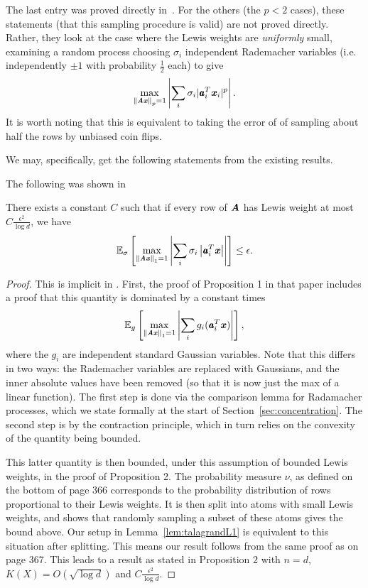 The last entry was proved directly in~\cite{BourgainLM89}.  For the others (the $p < 2$ cases),
these statements (that this sampling procedure is valid) are not proved directly.  Rather,
they look at the case where the Lewis weights are \emph{uniformly} small,
examining a random process choosing $\sigma_i$ independent Rademacher variables
(i.e. independently $\pm 1$ with probability $\frac{1}{2}$ each) to give
\begin{equation*}
\max_{\norm{\AA \xx}_p = 1} \left | \sum_i \sigma_i |\aa_i^T \xx_i|^p \right |.
\end{equation*}
It is worth noting that this is equivalent to taking the error of of sampling
about half the rows by unbiased coin flips.

We may, specifically, get the following statements from the existing results.

The following was shown in~\cite{Talagrand90}
\begin{lemma}
\label{lem:talagrandL1}
There exists a constant $C$ such that if every row of $\AA$ has
Lewis weight at most $C \frac{\epsilon^2}{\log d}$, we have
\begin{equation*}
\expec{\sigma}{\max_{\norm{\AA \xx}_1 = 1}
\left | \sum_i \sigma_i \left|\aa_i^T \xx \right| \right|} \leq \epsilon.
\end{equation*}
\end{lemma}

\begin{proof}
This is implicit in \cite{Talagrand90}.  First, the proof of Proposition 1 in that paper includes a proof that this quantity is dominated by a constant times
\begin{equation*}
\expec{g}{\max_{\norm{\AA \xx}_1 = 1}
\left | \sum_i g_i ( \aa_i^T \xx ) \right |},
\end{equation*}
where the $g_i$ are independent standard Gaussian variables.  Note that this differs in two ways: the Rademacher variables are replaced with Gaussians, and
the inner absolute values have been removed (so that it is now just the max of a linear function). 
The first step is done via the comparison lemma for Radamacher processes,
which we state formally at the start of Section~\ref{sec:concentration}.
The second step is by the contraction principle, which in turn relies on the
convexity of the quantity being bounded.

This latter quantity is then bounded, under this assumption of bounded Lewis weights,
in the proof of Proposition 2.
The probability measure $\nu$, as defined on the bottom of page 366
corresponds to the probability distribution of rows proportional to
their Lewis weights.
It is then split into atoms with small Lewis weights, and shows that randomly
sampling a subset of these atoms gives the bound above.
Our setup in Lemma~\ref{lem:talagrandL1} is equivalent to this
situation after splitting.
This means our result follows from the same proof as on page 367.
This leads to a result as stated in Proposition $2$ with $n = d$,
$K(X) = O(\sqrt{\log{d}})$
and $C \frac{\epsilon^2}{\log d}$.
\end{proof}


